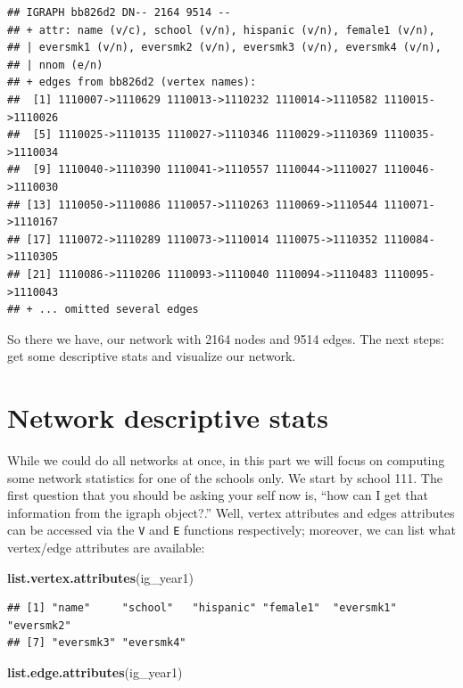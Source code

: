 \documentclass[]{book}
\newenvironment{Shaded}{\begin{snugshade}}{\end{snugshade}}
\newcommand{\KeywordTok}[1]{\textcolor[rgb]{0.13,0.29,0.53}{\textbf{#1}}}
\newcommand{\NormalTok}[1]{#1}
\theoremstyle{definition}
\theoremstyle{definition}
\theoremstyle{definition}
\theoremstyle{remark}
\begin{document}
\begin{verbatim}
## IGRAPH bb826d2 DN-- 2164 9514 -- 
## + attr: name (v/c), school (v/n), hispanic (v/n), female1 (v/n),
## | eversmk1 (v/n), eversmk2 (v/n), eversmk3 (v/n), eversmk4 (v/n),
## | nnom (e/n)
## + edges from bb826d2 (vertex names):
##  [1] 1110007->1110629 1110013->1110232 1110014->1110582 1110015->1110026
##  [5] 1110025->1110135 1110027->1110346 1110029->1110369 1110035->1110034
##  [9] 1110040->1110390 1110041->1110557 1110044->1110027 1110046->1110030
## [13] 1110050->1110086 1110057->1110263 1110069->1110544 1110071->1110167
## [17] 1110072->1110289 1110073->1110014 1110075->1110352 1110084->1110305
## [21] 1110086->1110206 1110093->1110040 1110094->1110483 1110095->1110043
## + ... omitted several edges
\end{verbatim}

So there we have, our network with 2164 nodes and 9514 edges. The next
steps: get some descriptive stats and visualize our network.

\section{Network descriptive stats}\label{network-descriptive-stats}

While we could do all networks at once, in this part we will focus on
computing some network statistics for one of the schools only. We start
by school 111. The first question that you should be asking your self
now is, ``how can I get that information from the igraph object?.''
Well, vertex attributes and edges attributes can be accessed via the
\texttt{V} and \texttt{E} functions respectively; moreover, we can list
what vertex/edge attributes are available:

\begin{Shaded}
\begin{Highlighting}[]
\KeywordTok{list.vertex.attributes}\NormalTok{(ig_year1)}
\end{Highlighting}
\end{Shaded}

\begin{verbatim}
## [1] "name"     "school"   "hispanic" "female1"  "eversmk1" "eversmk2"
## [7] "eversmk3" "eversmk4"
\end{verbatim}

\begin{Shaded}
\begin{Highlighting}[]
\KeywordTok{list.edge.attributes}\NormalTok{(ig_year1) }
\end{Highlighting}
\end{Shaded}
\end{document}
